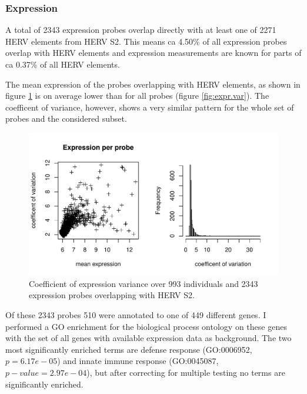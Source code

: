 \documentclass[a4paper,12pt]{article}
\begin{document}
\subsubsection{Expression}
A total of 2343 expression probes overlap directly with at least one of 2271 HERV elements from HERV S2. This means ca 4.50\% of all expression probes overlap with HERV elements and expression measurements are known for parts of ca 0.37\% of all HERV elements.

The mean expression of the probes overlapping with HERV elements, as shown in figure \ref{fig:hervS2.expr.var} is on average lower than for all probes (figure \ref{fig:expr.var}). The coefficent of variance, however, shows a very similar pattern for the whole set of probes and the considered subset.

\begin{figure}[tb]
	\includegraphics[scale = 1, keepaspectratio = true]{../figures/hervS2_expr_var}  
	\caption{Coefficient of expression variance over 993 individuals and 2343 expression probes overlapping with HERV S2.}
    \label{fig:hervS2.expr.var}
\end{figure}

Of these 2343 probes 510 were annotated to one of 449 different genes. I performed a GO enrichment for the biological process ontology on these genes with the set of all genes with available expression data as background. The two most significantly enriched terms are defense response (GO:0006952, $p=6.17e-05$) and innate immune response (GO:0045087, $p-value=	
2.97e-04$), but after correcting for multiple testing no terms are significantly enriched.

\end{document}

